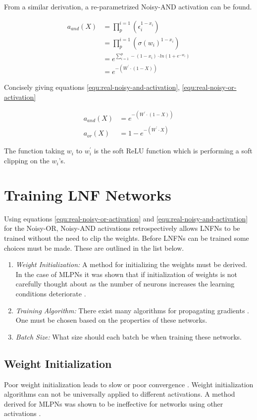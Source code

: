 From a similar derivation, a re-parametrized Noisy-AND activation can be found.

\begin{align*}
a_{and}(X) &= \prod_{p}^{i=1} (\epsilon_i^{1 - x_i})\\
&= \prod_{p}^{i=1} (\sigma(w_i)^{1 - x_i})\\
&= e^{\sum^p_{i=1} -(1 - x_i) \cdot ln(1 + e^{-w_i})}\\
&= e^{-(W^{'} \cdot (1 - X))}
\end{align*}

Concisely giving equations \ref{equ:real-noisy-and-activation}, \ref{equ:real-noisy-or-activation}

\begin{align}
a_{and}(X) &= e^{-(W^{'} \cdot (1 - X))} \label{equ:real-noisy-and-activation}\\
a_{or}(X)&= 1 - e^{-(W^{'} \cdot X)} \label{equ:real-noisy-or-activation}
\end{align}

The function taking $w_i$ to $w_i^{'}$ is the soft ReLU function which is performing a soft clipping on the $w_i$'s. 

\section{Training LNF Networks}
Using equations \ref{equ:real-noisy-or-activation} and \ref{equ:real-noisy-and-activation} for the Noisy-OR, Noisy-AND activations retrospectively allows LNFNs to be trained without the need to clip the weights. Before LNFNs can be trained some choices must be made. These are outlined in the list below.

\begin{enumerate}
	\item \textit{Weight Initialization:} A method for initializing the weights must be derived. In the case of MLPNs it was shown that if initialization of weights is not carefully thought about as the number of neurons increases the learning conditions deteriorate \cite{glorot2010understanding}.
	\item \textit{Training Algorithm:} There exist many algorithms for propagating gradients \cite{ruder2016overview}. One must be chosen based on the properties of these networks.
	\item \textit{Batch Size:} What size should each batch be when training these networks.
\end{enumerate}

\subsection{Weight Initialization} \label{subsec:weight-initlization}
Poor weight initialization leads to slow or poor convergence \cite{mishkin2015all}. Weight initialization algorithms can not be universally applied to different activations. A method derived for MLPNs was shown to be ineffective for networks using other activations \cite{he2015delving}.

